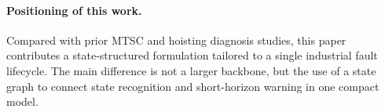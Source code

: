\paragraph{Positioning of this work.}
Compared with prior MTSC and hoisting diagnosis studies, this paper contributes a state-structured formulation tailored to a single industrial fault lifecycle. The main difference is not a larger backbone, but the use of a state graph to connect state recognition and short-horizon warning in one compact model.
